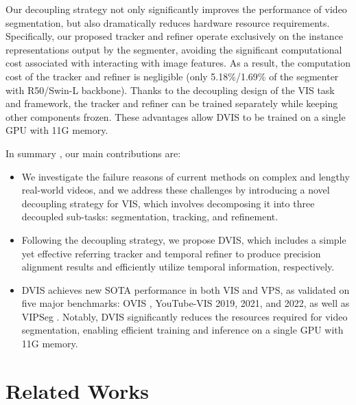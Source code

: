 \documentclass[10pt,twocolumn,letterpaper]{article}
\begin{document}
Our decoupling strategy not only significantly improves the performance of video segmentation, but also dramatically reduces hardware resource requirements. Specifically, our proposed tracker and refiner operate exclusively on the instance representations output by the segmenter, avoiding the significant computational cost associated with interacting with image features. As a result, the computation cost of the tracker and refiner is negligible (only 5.18\%/1.69\% of the segmenter with R50/Swin-L backbone). Thanks to the decoupling design of the VIS task and framework, the tracker and refiner can be trained separately while keeping other components frozen. These advantages allow DVIS to be trained on a single GPU with 11G memory.

In summary , our main contributions are:
\begin{itemize}
\item We investigate the failure reasons of current methods on complex and lengthy real-world videos, and we address these challenges by introducing a novel decoupling strategy for VIS, which involves decomposing it into three decoupled sub-tasks: segmentation, tracking, and refinement.
\item Following the decoupling strategy, we propose DVIS, which includes a simple yet effective referring tracker and temporal refiner to produce precision alignment results and efficiently utilize temporal information, respectively.
\item DVIS achieves new SOTA performance in both VIS and VPS, as validated on five major benchmarks: OVIS \cite{ovis}, YouTube-VIS \cite{masktrackrcnn} 2019, 2021, and 2022, as well as VIPSeg \cite{clippanofcn}. Notably, DVIS significantly reduces the resources required for video segmentation, enabling efficient training and inference on a single GPU with 11G memory.
\end{itemize}
\section{Related Works}
\end{document}
